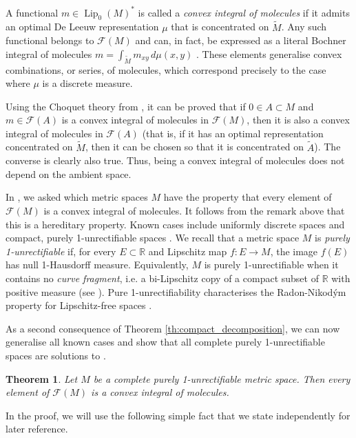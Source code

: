 \documentclass[a4paper,10pt]{amsart}
\DeclareMathOperator{\Lip}{Lip}                             %
\newcommand{\RR}{\mathbb{R}}                                %
\newcommand{\lipfree}[1]{\mathcal{F}({#1})}                 %
\newcommand{\wt}[1]{\widetilde{#1}}                         %
\theoremstyle{plain}
\newtheorem{theorem}{Theorem}[section]
\theoremstyle{definition}
\theoremstyle{remark}
\begin{document}
A functional $m\in\Lip_0(M)^*$ is called a \emph{convex integral of molecules} if it admits an optimal De Leeuw representation $\mu$ that is concentrated on $\wt{M}$. Any such functional belongs to $\lipfree{M}$ and can, in fact, be expressed as a literal Bochner integral of molecules $m=\int_{\wt{M}} m_{xy}\,d\mu(x,y)$ \cite[Proposition 2.6]{APS1}. These elements generalise convex combinations, or series, of molecules, which correspond precisely to the case where $\mu$ is a discrete measure.

Using the Choquet theory from \cite{Smith24}, it can be proved that if $0\in A\subset M$ and $m\in\lipfree{A}$ is a convex integral of molecules in $\lipfree{M}$, then it is also a convex integral of molecules in $\lipfree{A}$ \cite[Corollary 4.12]{Smith24} (that is, if it has an optimal representation concentrated on $\wt{M}$, then it can be chosen so that it is concentrated on $\wt{A}$). The converse is clearly also true. Thus, being a convex integral of molecules does not depend on the ambient space.

In \cite[Problem 6.9 (b)]{APS2}, we asked which metric spaces $M$ have the property that every element of $\lipfree{M}$ is a convex integral of molecules. It follows from the remark above that this is a hereditary property. Known cases include uniformly discrete spaces \cite[Corollary 3.7]{APS1} and compact, purely 1-unrectifiable spaces \cite[Corollary 6.6]{APS2}. We recall that a metric space $M$ is \emph{purely 1-unrectifiable} if, for every $E\subset\RR$ and Lipschitz map $f:E\to M$, the image $f(E)$ has null 1-Hausdorff measure. Equivalently, $M$ is purely 1-unrectifiable when it contains no \emph{curve fragment}, i.e. a bi-Lipschitz copy of a compact subset of $\RR$ with positive measure (see \cite[Corollary 1.12]{AGPP}). Pure 1-unrectifiability characterises the Radon-Nikod\'ym property for Lipschitz-free spaces \cite[Theorem C]{AGPP}.

As a second consequence of Theorem \ref{th:compact_decomposition}, we can now generalise all known cases and show that all complete purely 1-unrectifiable spaces are solutions to \cite[Problem 6.9 (b)]{APS2}.


\begin{theorem}\label{th:p1u_cim}
Let $M$ be a complete purely 1-unrectifiable metric space. Then every element of $\lipfree{M}$ is a convex integral of molecules.
\end{theorem}

In the proof, we will use the following simple fact that we state independently for later reference.
\end{document}
